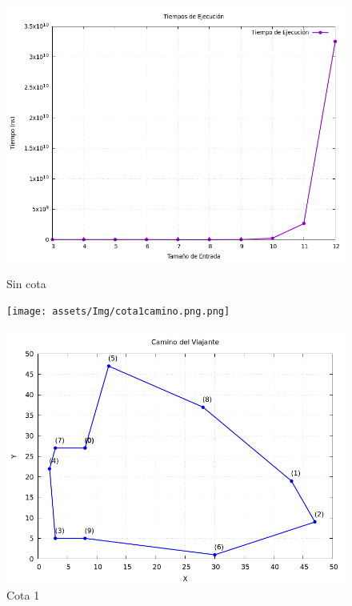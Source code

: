 \documentclass[11pt,openany]{book}
\begin{document}
\begin{figure}[H]
    \centering
    \begin{minipage}{.48\textwidth}
        \centering
        \includegraphics[width=1\linewidth]{assets/Img/grafico_tiempos0.png}
        \caption{Sin cota}
        \label{fig:Sin cota}
  \end{minipage}%
    \begin{minipage}{.48\textwidth}
          \centering
          \texttt{[image: assets/Img/cota1camino.png.png]}
          \caption{Cota 1}
          \label{fig:Cota 1 camino }
    \end{minipage}%
    \begin{minipage}{.48\textwidth}
          \centering
          \includegraphics[width=1\linewidth]{assets/Img/cota2camino.png}

\end{minipage}
\end{figure}
\end{document}
